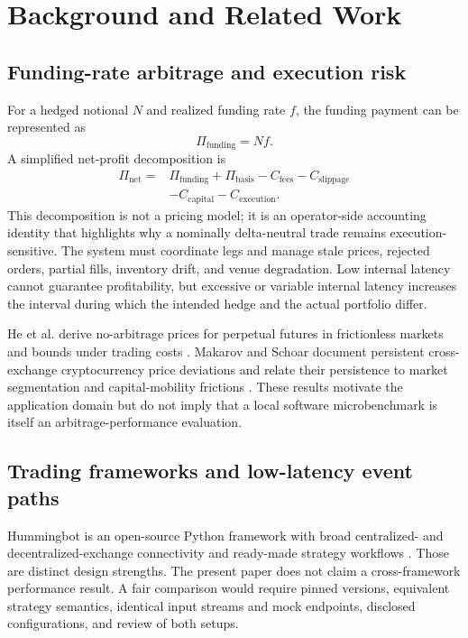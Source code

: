 \documentclass[11pt]{article}
\begin{document}
\section{Background and Related Work}

\subsection{Funding-rate arbitrage and execution risk}

For a hedged notional $N$ and realized funding rate $f$, the funding payment can be represented as
\begin{equation}
    \Pi_{\mathrm{funding}} = Nf.
\end{equation}
A simplified net-profit decomposition is
\begin{equation}
\begin{split}
    \Pi_{\mathrm{net}} ={}& \Pi_{\mathrm{funding}} + \Pi_{\mathrm{basis}}
    - C_{\mathrm{fees}} - C_{\mathrm{slippage}} \\
    &- C_{\mathrm{capital}} - C_{\mathrm{execution}}.
\end{split}
\end{equation}
This decomposition is not a pricing model; it is an operator-side accounting identity that highlights why a nominally delta-neutral trade remains execution-sensitive. The system must coordinate legs and manage stale prices, rejected orders, partial fills, inventory drift, and venue degradation. Low internal latency cannot guarantee profitability, but excessive or variable internal latency increases the interval during which the intended hedge and the actual portfolio differ.

He et al. derive no-arbitrage prices for perpetual futures in frictionless markets and bounds under trading costs \cite{he2024perpetual}. Makarov and Schoar document persistent cross-exchange cryptocurrency price deviations and relate their persistence to market segmentation and capital-mobility frictions \cite{makarov2020trading}. These results motivate the application domain but do not imply that a local software microbenchmark is itself an arbitrage-performance evaluation.

\subsection{Trading frameworks and low-latency event paths}

Hummingbot is an open-source Python framework with broad centralized- and decentralized-exchange connectivity and ready-made strategy workflows \cite{hummingbot2026}. Those are distinct design strengths. The present paper does not claim a cross-framework performance result. A fair comparison would require pinned versions, equivalent strategy semantics, identical input streams and mock endpoints, disclosed configurations, and review of both setups.
\end{document}
